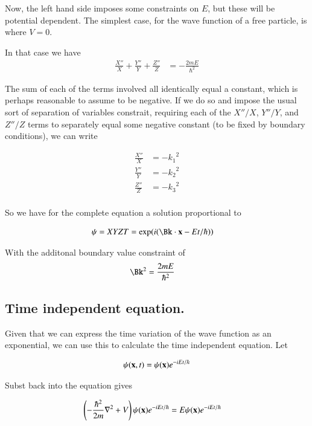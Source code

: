 \documentclass{article}
\begin{document}
Now, the left hand side imposes some constraints on $E$, but these will be potential dependent.
The simplest case, for the wave function of a free particle, is where $V=0$.

In that case we have
\begin{align*}
\frac{X''}{X} +\frac{Y''}{Y} +\frac{Z''}{Z} &= - \frac{2 m E}{\hbar^2}
\end{align*}

The sum of each of the terms involved all identically equal a constant, which is perhaps
reasonable to assume to be negative.  If we do so and impose the usual sort of separation of
variables constrait, requiring each of the $X''/X$, $Y''/Y$, and $Z''/Z$ terms to separately
equal some negative constant (to be fixed by boundary conditions), we can write

\begin{align*}
\frac{X''}{X} &= -{k_1}^2 \\
\frac{Y''}{Y} &= -{k_2}^2 \\
\frac{Z''}{Z} &= -{k_3}^2 \\
\end{align*}

So we have for the complete equation a solution proportional to

\begin{align*}
\psi = X Y Z T &= \exp(i(\Bk \cdot \Bx - E t/\hbar))
\end{align*}

With the additonal boundary value constraint of
\begin{align*}
\Bk^2 &= \frac{2 m E}{\hbar^2}
\end{align*}

\subsection{ Time independent equation. }

Given that we can express the time variation of the wave function as an exponential, we can use this to calculate the time independent equation.  Let

\begin{align*}
\psi(\mathbf{x},t) = \psi(\mathbf{x}) e^{-iEt/\hbar}
\end{align*}

Subst back into the equation gives

\begin{align*}
\left(-\frac{\hbar^2}{2m}\nabla^2 + V\right) \psi(\mathbf{x})e^{-iEt/\hbar} &= E\psi(\mathbf{x})e^{-iEt/\hbar}
\end{align*}
\end{document}
